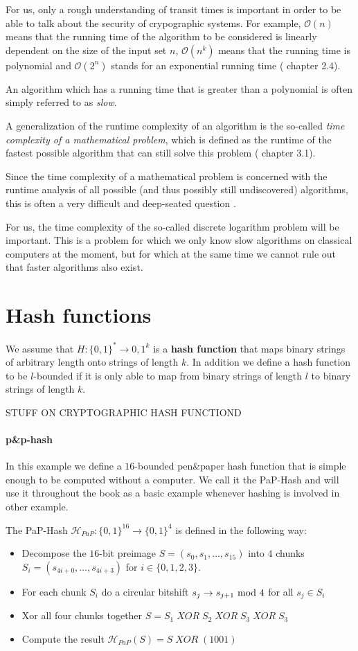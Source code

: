For us, only a rough understanding of transit times is important in order to be able to talk about the security of crypographic systems. For example, $\mathcal{O}(n)$ means that the running time of the algorithm to be considered is linearly dependent on the size of the input set $n$, $\mathcal{O}(n^k)$ means that the running time is polynomial and $\mathcal{O}(2^n) $ stands for an exponential running time (%
chapter 2.4).


An algorithm which has a running time that is greater than a polynomial is often simply referred to as \textit{slow}.

A generalization of the runtime complexity of an algorithm is the so-called \textit{time complexity of a mathematical problem}, which is defined as the runtime of the fastest possible algorithm that can still solve this problem (
chapter 3.1).

Since the time complexity of a mathematical problem is concerned with the runtime analysis of all possible (and thus possibly still undiscovered) algorithms, this is often a very difficult and deep-seated question .

For us, the time complexity of the so-called discrete logarithm problem will be important. This is a problem for which we only know slow algorithms on classical computers at the moment, but for which at the same time we cannot rule out that faster algorithms also exist.

\section{Hash functions}
We assume that $H: \{0,1\}^* \to {0,1}^k$ is a \textbf{hash function} that maps binary strings of arbitrary length onto strings of length $k$. In addition we define a hash function to be $l$-bounded if it is only able to map from binary strings of length $l$ to binary strings of length $k$. 

STUFF ON CRYPTOGRAPHIC HASH FUNCTIOND

\paragraph{p\&{}p-hash}
In this example we define a $16$-bounded pen\&{}paper hash function that is simple enough to be computed without a computer. We call it the PaP-Hash and will use it throughout the book as a basic example whenever hashing is involved in other example.

The PaP-Hash $\mathcal{H}_{PaP}: \{0,1\}^{16}\to \{0,1\}^4$ is defined in the following way:
\begin{itemize}
\item Decompose the $16$-bit preimage $S=(s_0,s_1,\ldots,s_{15})$ into $4$ chunks $S_i=(s_{4i+0},\ldots,s_{4i+3})$ for $i\in \{0,1,2,3\}$.
\item For each chunk $S_i$ do a circular bitshift $s_{j}\to s_{j+1} \text{ mod } 4$ for all $s_j\in S_i$
\item Xor all four chunks together $S = S_1\; XOR \; S_2\; XOR \; S_3\; XOR \; S_3$
\item Compute the result $\mathcal{H}_{PaP}(S) = S \; XOR\; (1001)$
\end{itemize}

